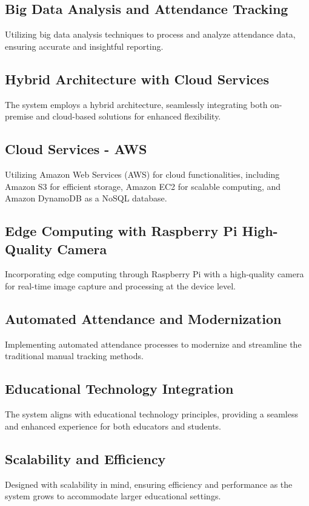 \documentclass[11pt]{article}
\begin{document}
\subsection{Big Data Analysis and Attendance Tracking}
Utilizing big data analysis techniques to process and analyze attendance data, ensuring accurate and insightful reporting.

\subsection{Hybrid Architecture with Cloud Services}
The system employs a hybrid architecture, seamlessly integrating both on-premise and cloud-based solutions for enhanced flexibility.

\subsection{Cloud Services - AWS}
Utilizing Amazon Web Services (AWS) for cloud functionalities, including Amazon S3 for efficient storage, Amazon EC2 for scalable computing, and Amazon DynamoDB as a NoSQL database.

\subsection{Edge Computing with Raspberry Pi High-Quality Camera}
Incorporating edge computing through Raspberry Pi with a high-quality camera for real-time image capture and processing at the device level.

\subsection{Automated Attendance and Modernization}
Implementing automated attendance processes to modernize and streamline the traditional manual tracking methods.

\subsection{Educational Technology Integration}
The system aligns with educational technology principles, providing a seamless and enhanced experience for both educators and students.

\subsection{Scalability and Efficiency}
Designed with scalability in mind, ensuring efficiency and performance as the system grows to accommodate larger educational settings.
\end{document}
